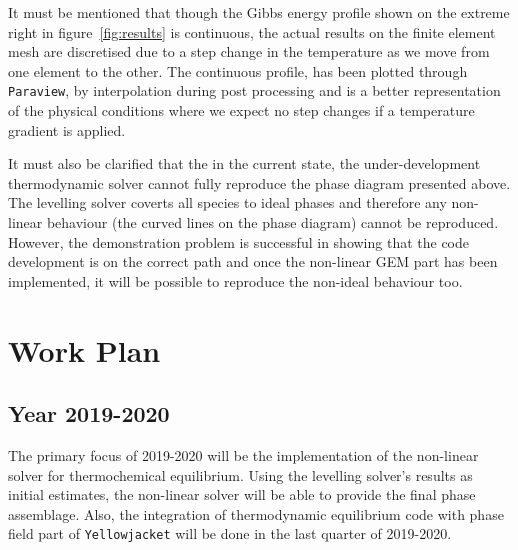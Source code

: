     It must be mentioned that though the Gibbs energy profile shown on the extreme right in figure~\ref{fig:results} is continuous, the actual results on the finite element mesh are discretised due to a step change in the temperature as we move from one element to the other. The continuous profile, has been plotted through \texttt{Paraview}, by interpolation during post processing and is a better representation of the physical conditions where we expect no step changes if a temperature gradient is applied.

    It must also be clarified that the in the current state, the under-development thermodynamic solver cannot fully reproduce the phase diagram presented above. The levelling solver coverts all species to ideal phases and therefore any non-linear behaviour (the curved lines on the phase diagram) cannot be reproduced. However, the demonstration problem is successful in showing that the code development is on the correct path and once the non-linear GEM part has been implemented, it will be possible to reproduce the non-ideal behaviour too.

\section{Work Plan} \label{sec:workplan}
	\subsection{Year 2019-2020}
	The primary focus of 2019-2020 will be the implementation of the non-linear solver for thermochemical equilibrium. Using the levelling solver's results as  initial estimates, the non-linear solver will be able to provide the final phase assemblage. Also, the integration of thermodynamic equilibrium code with phase field part of \texttt{Yellowjacket} will be done in the last quarter of 2019-2020.
